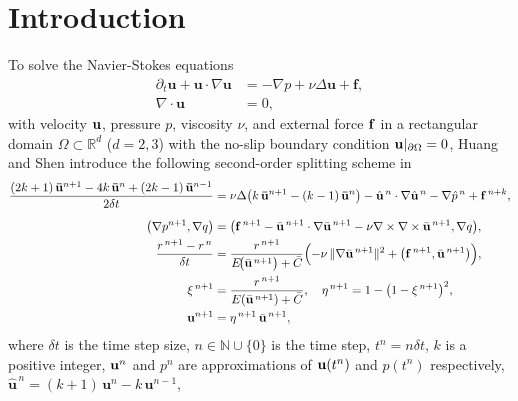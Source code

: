 \documentclass{article}
\theoremstyle{definition}                   %
\begin{document}
\section{Introduction}
\label{sec_intro}
To solve the Navier-Stokes equations
\begin{align}
    \partial_t \mathbf{u} + \mathbf{u} \cdot \nabla \mathbf{u} &= -\nabla p + \nu \Delta \mathbf{u} + \mathbf{f}, \label{ns1} \\
    \nabla \cdot \mathbf{u} &= 0, \label{ns2}
\end{align}
with velocity ${\bf u}$, pressure $p$, viscosity $\nu$, and external force ${\bf f}$ in a rectangular domain $\Omega \subset \mathbb{R}^d$ ($d=2,3$) with the no-slip boundary condition ${\bf u}|_{\partial\Omega}=0$, 
Huang and Shen introduce the following second-order splitting scheme in \cite{HuangShen2023}
\begin{subequations}\label{HSscheme}
\begin{align}
\frac{(2k+1)\,\mathbf{\bar{u}}^{n+1} - 4k\,\mathbf{\bar{u}}^{n} + (2k-1)\,\mathbf{\bar{u}}^{n-1}}{2\delta t} &=
\nu \Delta \!\left( k\,\mathbf{\bar{u}}^{n+1} - (k-1)\,\mathbf{\bar{u}}^{n} \right)
- \hat{\mathbf{u}}^{\,n} \cdot \nabla \hat{\mathbf{u}}^{\,n}
- \nabla \hat{p}^{\,n} + \mathbf{f}^{\,n+k}, 
\label{HSscheme-a}
\\[6pt]
\bigl(\nabla p^{n+1}, \nabla q \bigr) 
&= \bigl( \mathbf{f}^{\,n+1} 
- \bar{\mathbf{u}}^{\,n+1} \cdot \nabla \bar{\mathbf{u}}^{\,n+1} 
- \nu \nabla \times \nabla \times \bar{\mathbf{u}}^{\,n+1}, \nabla q \bigr),
\label{HSscheme-b}
 \\
\frac{r^{\,n+1} - r^{\,n}}{\delta t} 
&= \frac{r^{\,n+1}}{E\!\bigl(\bar{\mathbf{u}}^{\,n+1}\bigr) + \bar{C}}  \Bigl( - \nu \,\|\nabla \bar{\mathbf{u}}^{\,n+1}\|^2 
+ \bigl( \mathbf{f}^{\,n+1}, \bar{\mathbf{u}}^{\,n+1} \bigr) \Bigr), 
\label{HSscheme-c}
\\
\xi^{\,n+1} &= \frac{r^{\,n+1}} {E(\bar{\mathbf{u}}^{\,n+1}) + \bar{C}}, 
\quad \eta^{\,n+1} = 1 - \bigl(1 - \xi^{\,n+1}\bigr)^2, 
\label{HSscheme-d}
 \\
\mathbf{u}^{n+1} &= \eta^{\,n+1}\,\bar{\mathbf{u}}^{\,n+1}, 
\label{HSscheme-e}
\end{align}
\end{subequations}
where $\delta t$ is the time step size, $n\in\mathbb{N}\cup\{0\}$ is the time step, 
$t^n=n\delta t$, 
$k$ is a positive integer,  ${\bf u}^n$ and $p^n$ are approximations of ${\bf u}(t^n)$ and $p(t^n)$ respectively, 
$\hat{\mathbf{u}}^{\,n} = (k+1)\,\mathbf{u}^{n} - k\,\mathbf{u}^{n-1}$, 
\end{document}

